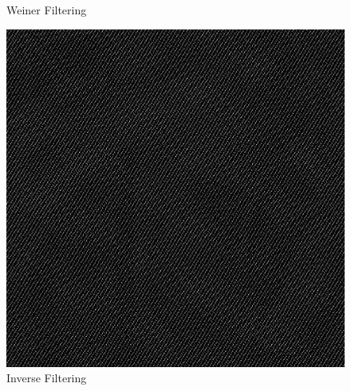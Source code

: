 \documentclass{article}
\begin{document}
\begin{figure}[!htb]
      \caption{Weiner Filtering}
    \endminipage\hfill
      \includegraphics[scale=.28]{./deblurring/0_001/inverse.png}
      \caption{Inverse Filtering}
    \endminipage
    \end{figure}
    \pagebreak
\end{document}
